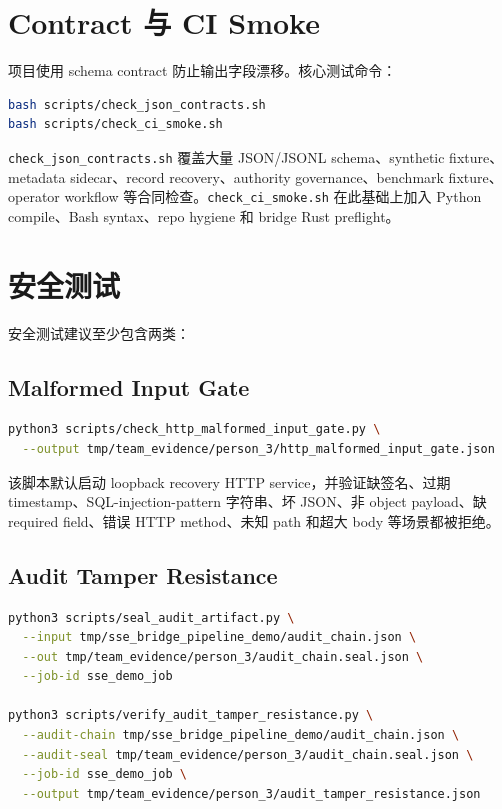 \documentclass[UTF8,a4paper,12pt,oneside]{ctexrep}
\begin{document}
\section{Contract 与 CI Smoke}

项目使用 schema contract 防止输出字段漂移。核心测试命令：

\begin{lstlisting}[language=bash]
bash scripts/check_json_contracts.sh
bash scripts/check_ci_smoke.sh
\end{lstlisting}

\texttt{check\_json\_contracts.sh} 覆盖大量 JSON/JSONL schema、synthetic fixture、metadata sidecar、record recovery、authority governance、benchmark fixture、operator workflow 等合同检查。\texttt{check\_ci\_smoke.sh} 在此基础上加入 Python compile、Bash syntax、repo hygiene 和 bridge Rust preflight。

\section{安全测试}

安全测试建议至少包含两类：

\subsection{Malformed Input Gate}

\begin{lstlisting}[language=bash]
python3 scripts/check_http_malformed_input_gate.py \
  --output tmp/team_evidence/person_3/http_malformed_input_gate.json
\end{lstlisting}

该脚本默认启动 loopback recovery HTTP service，并验证缺签名、过期 timestamp、SQL-injection-pattern 字符串、坏 JSON、非 object payload、缺 required field、错误 HTTP method、未知 path 和超大 body 等场景都被拒绝。

\subsection{Audit Tamper Resistance}

\begin{lstlisting}[language=bash]
python3 scripts/seal_audit_artifact.py \
  --input tmp/sse_bridge_pipeline_demo/audit_chain.json \
  --out tmp/team_evidence/person_3/audit_chain.seal.json \
  --job-id sse_demo_job

python3 scripts/verify_audit_tamper_resistance.py \
  --audit-chain tmp/sse_bridge_pipeline_demo/audit_chain.json \
  --audit-seal tmp/team_evidence/person_3/audit_chain.seal.json \
  --job-id sse_demo_job \
  --output tmp/team_evidence/person_3/audit_tamper_resistance.json
\end{lstlisting}
\end{document}

